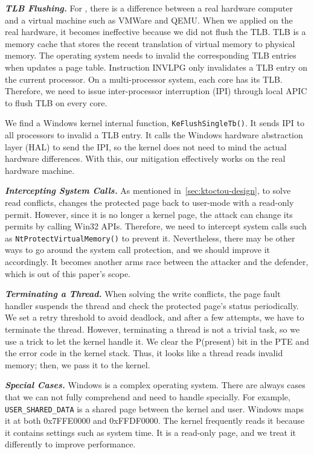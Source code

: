 \textbf{\textit{TLB Flushing.}} For \name, there is a difference between a real hardware computer and a virtual machine such as VMWare and QEMU.  When we applied \name on the real hardware, it becomes ineffective because we did not flush the TLB.  TLB is a memory cache that stores the recent translation of virtual memory to physical memory. The operating system needs to invalid the corresponding TLB entries when updates a page table. Instruction INVLPG only invalidates a TLB entry on the current processor. On a multi-processor system, each core has its TLB. Therefore, we need to issue inter-processor interruption (IPI) through local APIC to flush TLB on every core. 

We find a Windows kernel internal function, \texttt{KeFlushSingleTb()}. It sends IPI to all processors to invalid a TLB entry.  It calls the Windows hardware abstraction layer (HAL) to send the IPI, so the kernel does not need to mind the actual hardware differences. With this, our mitigation effectively works on the real hardware machine.


\textbf{\textit{Intercepting System Calls.}} As mentioned in~\autoref{sec:ktoctou-design}, to solve read conflicts, \name changes the protected page back to user-mode with a read-only permit. However, since it is no longer a kernel page, the attack can change its permits by calling Win32 APIs. Therefore, we need to intercept system calls  such as \texttt{NtProtectVirtualMemory()} to prevent it. Nevertheless, there may be other ways to go around the system call protection, and we should improve it accordingly. It becomes another arms race between the attacker and the defender, which is out of this paper's scope.



\textbf{\textit{Terminating a Thread.}} When solving the write conflicts, the page fault handler suspends the thread and check the protected page's status periodically. We set a retry threshold to avoid deadlock, and after a few attempts, we have to terminate the thread. However, terminating a thread is not a trivial task, so we use a trick to let the kernel handle it. We clear the P(present) bit in the PTE and the error code in the kernel stack. Thus, it looks like a thread reads invalid memory; then, we pass it to the kernel.


\textbf{\textit{Special Cases.}} Windows is a complex operating system. There are always cases that we can not fully comprehend and need to handle specially. For example, \texttt{USER\_SHARED\_DATA} is a shared page between the kernel and user. Windows maps it at both 0x7FFE0000 and 0xFFDF0000. The kernel frequently reads it because it contains settings such as system time. It is a read-only page, and we treat it differently to improve performance.
